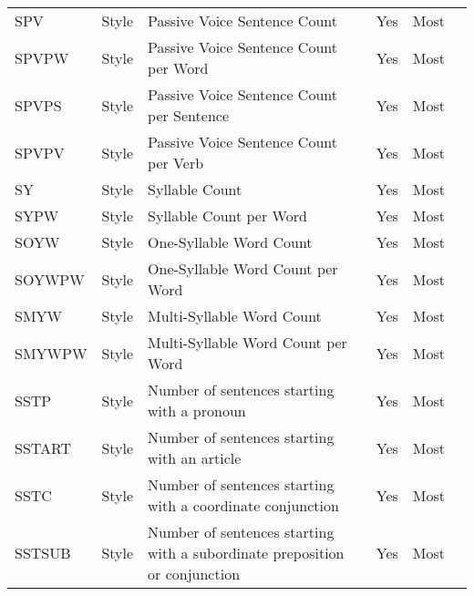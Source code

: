\begin{longtable}{l l m{} c c m{}}
    SPV & Style & Passive Voice Sentence Count & Yes & Most & \cite{Dalip2009_lr14, Wang2020_lr26, Wu2010_lr61, Wang2019_lr74, Bassani2019_lr359, Dalip2016_lr1002, Dalip2011_lr1003, Dalip2014_lr1004, Olcer2022_lr2017, Magalhaes2019_lr2028} \\
    SPVPW & Style & Passive Voice Sentence Count per Word & Yes & Most & \cite{Bassani2019_lr359} \\
    SPVPS & Style & Passive Voice Sentence Count per Sentence & Yes & Most & \cite{Anderka2012_lr17, Ferretti2012_lr115, Pereyra2019_lr147, Bassani2019_lr359} \\
    SPVPV & Style & Passive Voice Sentence Count per Verb & Yes & Most & \cite{Bassani2019_lr359} \\
    SY & Style & Syllable Count & Yes & Most & \cite{Blumenstock2008_lr4, Anderka2012_lr17, Ferretti2012_lr115, Dang2021_lr136, Pereyra2019_lr147, Bassani2019_lr359} \\
    SYPW & Style & Syllable Count per Word & Yes & Most & \cite{Anderka2012_lr17, Ferretti2012_lr115, Pereyra2019_lr147, Bassani2019_lr359} \\
    SOYW & Style & One-Syllable Word Count & Yes & Most & \cite{Blumenstock2008_lr4, Anderka2012_lr17, Ferretti2012_lr115, Pereyra2019_lr147} \\
    SOYWPW & Style & One-Syllable Word Count per Word & Yes & Most & \cite{Anderka2012_lr17, Ferretti2012_lr115, Pereyra2019_lr147} \\
    SMYW & Style & Multi-Syllable Word Count & Yes & Most & \cite{} \\
    SMYWPW & Style & Multi-Syllable Word Count per Word & Yes & Most & \cite{Wu2010_lr61, Marzini2014_lr2010} \\
    SSTP & Style & Number of sentences starting with a pronoun & Yes & Most & \cite{Dalip2009_lr14, Wang2020_lr26, Wang2019_lr74, Bassani2019_lr359, Dalip2011_lr1003, Dalip2014_lr1004, Olcer2022_lr2017, Magalhaes2019_lr2028} \\
    SSTART & Style & Number of sentences starting with an article & Yes & Most & \cite{Dalip2009_lr14, Wang2020_lr26, Wang2019_lr74, Bassani2019_lr359, Dalip2011_lr1003, Dalip2014_lr1004, Magalhaes2019_lr2028} \\
    SSTC & Style & Number of sentences starting with a coordinate conjunction & Yes & Most & \cite{Dalip2009_lr14, Wang2020_lr26, Wang2019_lr74, Bassani2019_lr359, Dalip2011_lr1003, Dalip2014_lr1004, Magalhaes2019_lr2028} \\
    SSTSUB & Style & Number of sentences starting with a subordinate preposition or conjunction & Yes & Most & \cite{Dalip2009_lr14, Wang2020_lr26, Wang2019_lr74, Bassani2019_lr359, Dalip2011_lr1003, Dalip2014_lr1004, Magalhaes2019_lr2028} \\

\end{longtable}
